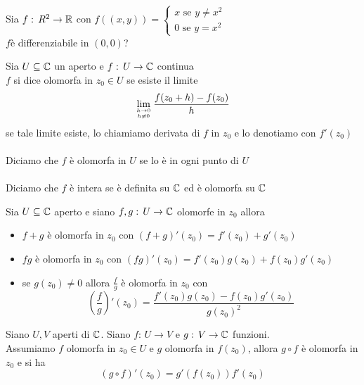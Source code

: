 \begin{ex}Sia $f:\, R^2 \to \mathbb{R}$ con $f((x,y))=\begin{cases} x \text{ se } y \neq x^2 \\ 0 \text{ se } y=x^2\end{cases}$\\
$f$\`e differenziabile in $(0,0)$?
\end{ex}
\begin{defn}\bianco 
Sia $U\subseteq \mathbb{C}$ un aperto e $f:\, U \to \mathbb{C}$ continua\\
$f$ si dice olomorfa in $z_0\in U$ se esiste il limite 
$$\lim_{h \to 0\atop{h\neq 0}}\frac{f(z_0+h)-f(z_0)}{h}$$
se tale limite esiste, lo chiamiamo derivata di $f$ in $z_0$ e lo denotiamo con $f'(z_0)$\\ \\ 
Diciamo che $f$ \`e olomorfa in $U$ se lo \`e in ogni punto di $U$\\ \\
Diciamo che $f$ \`e intera se \`e definita su $\mathbb{C}$ ed \`e olomorfa su $\mathbb{C}$
\end{defn}
\begin{prop}Sia $U\subseteq \mathbb{C}$ aperto e siano $f,g:\, U \to \mathbb{C}$ olomorfe in $z_0$ allora 
\begin{itemize}
\item $f+g$ \`e olomorfa in $z_0$ con $(f+g)'(z_0)=f'(z_0)+g'(z_0)$
\item $fg$ \`e olomorfa in $z_0$ con $(fg)'(z_0)=f'(z_0)g(z_0)+f(z_0)g'(z_0)$
\item se $g(z_0)\neq 0 $ allora $\frac{f}{g}$ \`e olomorfa in $z_0$ con 
$$ \left(\frac{f}{g}\right)'(z_0)=\frac{f'(z_0)g(z_0)-f(z_0)g'(z_0)}{g(z_0)^2}$$
\end{itemize}
\end{prop}
\begin{prop}
Siano $U,V$ aperti di $\mathbb{C}$. Siano $f:\, U \to V$ e $g:\, V\to \mathbb{C}$ funzioni.\\
Assumiamo $f$ olomorfa in $z_0\in U$ e $g$ olomorfa in $f(z_0)$, allora $g\circ f$ \`e olomorfa in $z_0$ e si ha
$$ (g\circ f)'(z_0)= g'(f(z_0))f'(z_0)$$
\end{prop}
